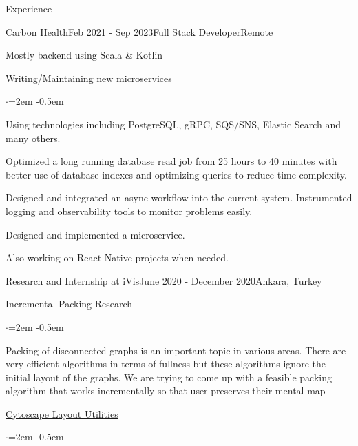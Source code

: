 \documentclass{resume} %
\begin{document}
\begin{rSection}{Experience}

\begin{rSubsection}{Carbon Health}{Feb 2021 - Sep 2023}{Full Stack Developer}{Remote}
\item Mostly backend using Scala \& Kotlin
\item Writing/Maintaining new microservices
\begin{list}{$\cdot$}{\leftmargin=2em}
\itemsep -0.5em \vspace{-0.5em} %
    \item Using technologies including PostgreSQL, gRPC, SQS/SNS, Elastic Search and many others.
    \item Optimized a long running database read job from 25 hours to 40 minutes with better use of database indexes and optimizing queries to reduce time complexity.
    \item Designed and integrated an async workflow into the current system. Instrumented logging and observability tools to monitor problems easily.
    \item Designed and implemented a microservice.    
\end{list}
\item Also working on React Native projects when needed.
\end{rSubsection}


\begin{rSubsection}{Research and Internship at iVis}{June 2020 - December 2020}{}{Ankara, Turkey}
\item Incremental Packing Research
\begin{list}{$\cdot$}{\leftmargin=2em}
\itemsep -0.5em \vspace{-0.5em} %
    \item Packing of disconnected graphs is an important topic in various areas. There are very efficient algorithms in terms of fullness but these algorithms ignore the initial layout of the graphs. We are trying to come up with a feasible packing algorithm that works incrementally so that user preserves their mental map
\end{list}
\item \href{https://github.com/iVis-at-Bilkent/cytoscape.js-layout-utilities}{Cytoscape Layout Utilities}
\begin{list}{$\cdot$}{\leftmargin=2em}
\itemsep -0.5em \vspace{-0.5em} %
\end{list}
\end{rSubsection}

\end{rSection}
\end{document}
